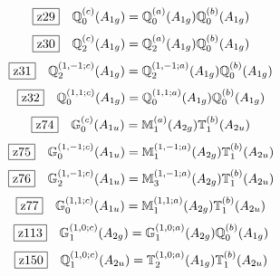 \documentclass[fleqn,10pt,landscape]{jsarticle}
\begin{document}
\begin{dmath*}
\hspace*{3mm}\fbox{z29}\quad \mathbb{Q}_{0}^{(c)}(A_{1g})=\mathbb{Q}_{0}^{(a)}(A_{1g}) \mathbb{Q}_{0}^{(b)}(A_{1g})
\end{dmath*}
\begin{dmath*}
\hspace*{3mm}\fbox{z30}\quad \mathbb{Q}_{2}^{(c)}(A_{1g})=\mathbb{Q}_{2}^{(a)}(A_{1g}) \mathbb{Q}_{0}^{(b)}(A_{1g})
\end{dmath*}
\begin{dmath*}
\hspace*{3mm}\fbox{z31}\quad \mathbb{Q}_{2}^{(1,-1;c)}(A_{1g})=\mathbb{Q}_{2}^{(1,-1;a)}(A_{1g}) \mathbb{Q}_{0}^{(b)}(A_{1g})
\end{dmath*}
\begin{dmath*}
\hspace*{3mm}\fbox{z32}\quad \mathbb{Q}_{0}^{(1,1;c)}(A_{1g})=\mathbb{Q}_{0}^{(1,1;a)}(A_{1g}) \mathbb{Q}_{0}^{(b)}(A_{1g})
\end{dmath*}
\begin{dmath*}
\hspace*{3mm}\fbox{z74}\quad \mathbb{G}_{0}^{(c)}(A_{1u})=\mathbb{M}_{1}^{(a)}(A_{2g}) \mathbb{T}_{1}^{(b)}(A_{2u})
\end{dmath*}
\begin{dmath*}
\hspace*{3mm}\fbox{z75}\quad \mathbb{G}_{0}^{(1,-1;c)}(A_{1u})=\mathbb{M}_{1}^{(1,-1;a)}(A_{2g}) \mathbb{T}_{1}^{(b)}(A_{2u})
\end{dmath*}
\begin{dmath*}
\hspace*{3mm}\fbox{z76}\quad \mathbb{G}_{2}^{(1,-1;c)}(A_{1u})=\mathbb{M}_{3}^{(1,-1;a)}(A_{2g}) \mathbb{T}_{1}^{(b)}(A_{2u})
\end{dmath*}
\begin{dmath*}
\hspace*{3mm}\fbox{z77}\quad \mathbb{G}_{0}^{(1,1;c)}(A_{1u})=\mathbb{M}_{1}^{(1,1;a)}(A_{2g}) \mathbb{T}_{1}^{(b)}(A_{2u})
\end{dmath*}
\begin{dmath*}
\hspace*{3mm}\fbox{z113}\quad \mathbb{G}_{1}^{(1,0;c)}(A_{2g})=\mathbb{G}_{1}^{(1,0;a)}(A_{2g}) \mathbb{Q}_{0}^{(b)}(A_{1g})
\end{dmath*}
\begin{dmath*}
\hspace*{3mm}\fbox{z150}\quad \mathbb{Q}_{1}^{(1,0;c)}(A_{2u})=\mathbb{T}_{2}^{(1,0;a)}(A_{1g}) \mathbb{T}_{1}^{(b)}(A_{2u})
\end{dmath*}
\end{document}
